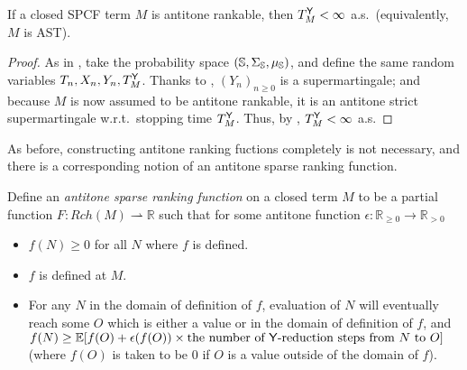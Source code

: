 \begin{theorem} \label{thm:antitone rankable implies termination}
If a closed SPCF term $M$ is antitone rankable, then $T_M^{\mathsf{Y}} < \infty$ a.s.~(equivalently, $M$ is AST).
\end{theorem}
\begin{proof}
As in %
,
take the probability space $({\mathbb{S}}, \Sigma_{\mathbb{S}}, \mu_{\mathbb{S}})$, and define the same random variables $T_n, X_n, Y_n, T_M^{\mathsf{Y}}$. 
Thanks to , $(Y_n)_{n \geq 0}$ is a supermartingale; and because $M$ is now assumed to be antitone rankable, it is an antitone strict supermartingale w.r.t.~stopping time $T_M^{\mathsf{Y}}$. 
Thus, by , $T_M^{\mathsf{Y}} < \infty$ a.s.
\end{proof}

As before, constructing antitone ranking fuctions completely is not necessary, and there is a corresponding notion of an antitone sparse ranking function.

Define an \emph{antitone sparse ranking function} on a closed term $M$ to be a partial function $F : Rch(M) \rightharpoonup \mathbb{R}$ such that for some antitone function $\epsilon : \mathbb{R}_{\geq 0} \to \mathbb{R}_{>0}$
\begin{itemize}
\item $f(N) \geq 0$ for all $N$ where $f$ is defined.
\item $f$ is defined at $M$.
\item For any $N$ in the domain of definition of $f$, evaluation of $N$ will eventually reach some $O$ which is either a value or in the domain of definition of $f$, and $f(N) \geq \mathbb E [f(O) + \epsilon(f(O)) \times \text{the number of $\mathsf{Y}$-reduction steps from $N$ to $O$}]$ (where $f(O)$ is taken to be 0 if $O$ is a value outside of the domain of $f$).
\end{itemize}

